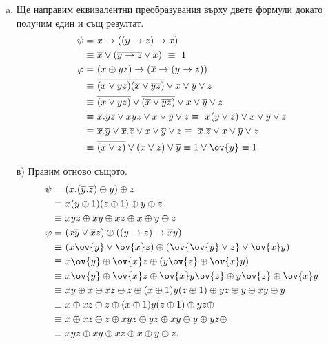 \begin{solution}
  \begin{enumerate}[a)]
  \item
    Ще направим еквивалентни преобразувания върху двете формули докато получим един и същ резултат.
    \begin{align*}
      \psi =\ &  x\rightarrow ((y\rightarrow z)\rightarrow x)\\
      \equiv\ & \overline{x}\vee (\overline{y\rightarrow z}\vee x)\  \equiv\ 1\\
      \varphi =\ & (x\oplus yz)\rightarrow (\overline{x}\rightarrow (y\rightarrow z))\\
      \equiv\ & \overline{(x\vee yz)(\overline{x}\vee\overline{yz})} \vee x\vee \overline{y}\vee z\\
      \equiv\ & \overline{(x\vee yz)}\vee\overline{(\overline{x}\vee\overline{yz})} \vee x\vee \overline{y}\vee z\\
      \equiv\ & \overline{x}.\overline{yz} \vee xyz \vee x\vee \overline{y}\vee z \equiv\ \overline{x}(\overline{y}\vee\overline{z}) \vee x\vee \overline{y}\vee z\\
      \equiv\ & \overline{x}.\overline{y} \vee \overline{x}.\overline{z} \vee x\vee \overline{y}\vee z \equiv\ \overline{x}.\overline{z} \vee x\vee \overline{y}\vee z\\
      \equiv\ & \overline{(x\vee z)} \vee (x\vee z)\vee \overline{y} \equiv 1 \vee \ov{y} \equiv 1.
    \end{align*}
  \item[в)]
    Правим отново същото.
    \begin{align*}
      \psi =\ & (x.(\overline{y}.\overline{z})\oplus y)\oplus z\\
      \equiv\ & x(y\oplus 1)(z\oplus 1) \oplus y \oplus z\\
      \equiv\ & xyz \oplus xy \oplus xz \oplus x \oplus y \oplus z\\
      \varphi =\ & (x\overline{y}\vee \overline{x}z)\oplus ((y\rightarrow z)\rightarrow \overline{x}y)\\
      \equiv\ & (x\ov{y}\vee \ov{x}z) \oplus (\ov{\ov{y}\vee z} \vee \ov{x}y)\\
      \equiv\ & x\ov{y}\oplus \ov{x}z \oplus (y\ov{z} \oplus \ov{x}y) \\
      \equiv\ & x\ov{y}\oplus \ov{x}z\oplus \ov{x}y\ov{z} \oplus y\ov{z} \oplus \ov{x}y \\
      \equiv\ & xy \oplus x \oplus xz \oplus z \oplus (x\oplus 1)y(z\oplus 1) \oplus yz\oplus y \oplus xy \oplus y \\
      \equiv\ & x \oplus xz \oplus z \oplus (x\oplus 1)y(z\oplus 1) \oplus yz\oplus  \\
      \equiv\ & x \oplus xz \oplus z \oplus xyz \oplus yz \oplus xy \oplus y \oplus yz\oplus\\
      \equiv\ & xyz \oplus xy \oplus xz \oplus x \oplus y \oplus z.
     \end{align*}
\end{enumerate}
\end{solution}

